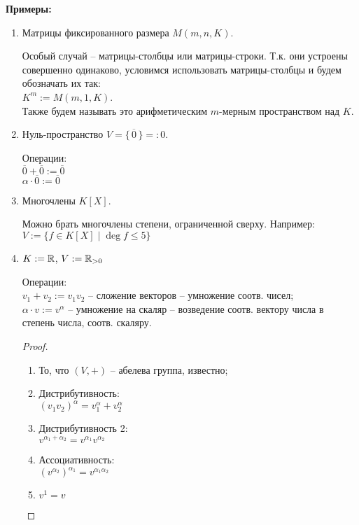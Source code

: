 \textbf{Примеры:}
\begin{enumerate}
    \item Матрицы фиксированного размера $M(m, n, K)$.
    
    Особый случай -- матрицы-столбцы или матрицы-строки. Т.к.
    они устроены совершенно одинаково, условимся использовать
    матрицы-столбцы и будем обозначать их так: \\
    $K^m := M(m, 1, K)$.\\
    Также будем называть это арифметическим $m$-мерным пространством
    над $K$.

    \item Нуль-пространство $V = \{\, \overline{0} \,\} =: 0$.
    
    Операции:\\
    $\overline{0} + \overline{0} := \overline{0}$\\
    $\alpha \cdot \overline{0} := \overline{0}$

    \item Многочлены $K[X]$.
    
    Можно брать многочлены степени, ограниченной сверху. Например:\\
    $V := \{ f \in K[X] \mid \deg f \leqslant 5 \}$

    \item $K := \mathbb{R}$, $V := \mathbb{R}_{> 0}$
    
    Операции:\\
    $v_1 + v_2 := v_1 v_2$ -- сложение векторов -- умножение соотв.
    чисел;\\
    $\alpha \cdot v := v ^ \alpha$ -- умножение на скаляр -- возведение
    соотв. вектору числа в степень числа, соотв. скаляру.

    \begin{proof} $ $

        \begin{enumerate}
            \item То, что $(V, +)$ -- абелева группа, известно;
            \item Дистрибутивность: \\
            $(v_1 v_2)^\alpha = v_1^\alpha + v_2^\alpha$
            \item Дистрибутивность 2: \\
            $v^{\alpha_1 + \alpha_2} = v^{\alpha_1} v^{\alpha_2}$
            \item Ассоциативность: \\
            $(v^{\alpha_2})^{\alpha_1} = v^{\alpha_1 \alpha_2}$
            \item $v ^ 1 = v$
        \end{enumerate}
    \end{proof}


\end{enumerate}
